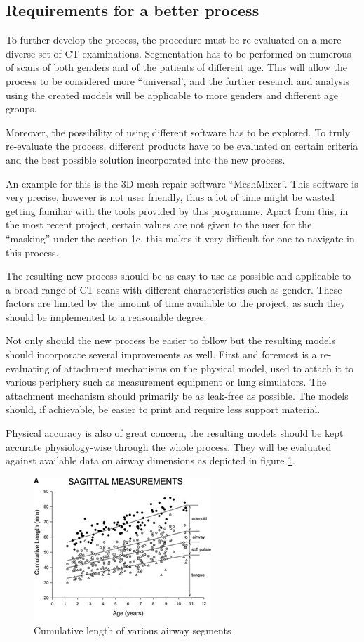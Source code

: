 \documentclass[MME,Projekt,english]{twbook}%
\begin{document}
\subsection{Requirements for a better process}
To further develop the process, the procedure must be re-evaluated on a more diverse set of CT examinations. Segmentation has to be performed on numerous of scans of both genders and of the patients of different age. This will allow the process to be considered more “universal’, and the further research and analysis using the created models will be applicable to more genders and different age groups. 

Moreover, the possibility of using different software has to be explored. To truly re-evaluate the process, different products have to be evaluated on certain criteria and the best possible solution incorporated into the new process.

An example for this is the 3D mesh repair software “MeshMixer”. This software is very precise, however is not user friendly, thus a lot of time might be wasted getting familiar with the tools provided by this programme. Apart from this, in the most recent project, certain values are not given to the user for the “masking” under the section 1c, this makes it very difficult for one to navigate in this process.

The resulting new process should be as easy to use as possible and applicable to a broad range of CT scans with different characteristics such as gender. These factors are limited by the amount of time available to the project, as such they should be implemented to a reasonable degree.

Not only should the new process be easier to follow but the resulting models should incorporate several improvements as well. First and foremost is a re-evaluating of attachment mechanisms on the physical model, used to attach it to various periphery such as measurement equipment or lung simulators. The attachment mechanism should primarily be as leak-free as possible. The models should, if achievable, be easier to print and require less support material.

Physical accuracy is also of great concern, the resulting models should be kept accurate physiology-wise through the whole process. They will be evaluated against available data on airway dimensions as depicted in figure \ref{length_of_airway_segments}.

\begin{figure}[!htbp]
	\centering
	\includegraphics[width=0.5\linewidth]{images/length_of_airway_segments}
	\caption{Cumulative length of various airway segments}\label{length_of_airway_segments}
\end{figure}
\end{document}
